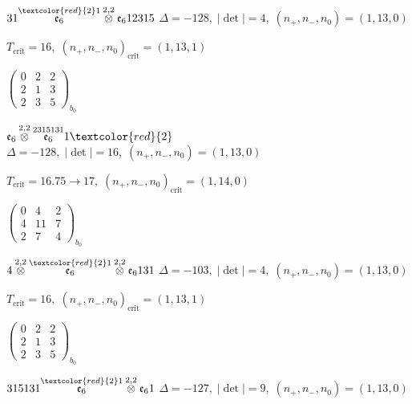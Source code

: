 \documentclass[10pt]{article}
\begin{document}
$31\overset{\textcolor{red}{2}1}{\mathfrak{e}_6}\overset{2,2}{\otimes}\mathfrak{e}_612315$ \quad $\Delta=-128,\; |\det|=4,\; (n_+,n_-,n_0)=(1,13,0)$

\hspace{1em}$T_{\text{crit}}=16,\; (n_+,n_-,n_0)_{\text{crit}}=(1,13,1)$

\hspace{2em}$\left(\begin{smallmatrix}0 & 2 & 2 \\ 2 & 1 & 3 \\ 2 & 3 & 5\end{smallmatrix}\right)_{\!b_0}$

\smallskip

$\mathfrak{e}_6\overset{2,2}{\otimes}\overset{2315131}{\mathfrak{e}_6}1\textcolor{red}{2}$ \quad $\Delta=-128,\; |\det|=16,\; (n_+,n_-,n_0)=(1,13,0)$

\hspace{1em}$T_{\text{crit}}=16.75 \to 17,\; (n_+,n_-,n_0)_{\text{crit}}=(1,14,0)$

\hspace{2em}$\left(\begin{smallmatrix}0 & 4 & 2 \\ 4 & 11 & 7 \\ 2 & 7 & 4\end{smallmatrix}\right)_{\!b_0}$

\smallskip

$4\overset{2,2}{\otimes}\overset{\textcolor{red}{2}1}{\mathfrak{e}_6}\overset{2,2}{\otimes}\mathfrak{e}_6131$ \quad $\Delta=-103,\; |\det|=4,\; (n_+,n_-,n_0)=(1,13,0)$

\hspace{1em}$T_{\text{crit}}=16,\; (n_+,n_-,n_0)_{\text{crit}}=(1,13,1)$

\hspace{2em}$\left(\begin{smallmatrix}0 & 2 & 2 \\ 2 & 1 & 3 \\ 2 & 3 & 5\end{smallmatrix}\right)_{\!b_0}$

\smallskip

$315131\overset{\textcolor{red}{2}1}{\mathfrak{e}_6}\overset{2,2}{\otimes}\mathfrak{e}_61$ \quad $\Delta=-127,\; |\det|=9,\; (n_+,n_-,n_0)=(1,13,0)$
\end{document}
